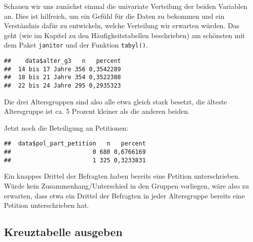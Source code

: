 \documentclass[
]{book}
\newenvironment{Shaded}{\begin{snugshade}}{\end{snugshade}}
\newcommand{\CommentTok}[1]{\textcolor[rgb]{0.56,0.35,0.01}{\textit{#1}}}
\newcommand{\FunctionTok}[1]{\textcolor[rgb]{0.00,0.00,0.00}{#1}}
\newcommand{\NormalTok}[1]{#1}
\newcommand{\SpecialCharTok}[1]{\textcolor[rgb]{0.00,0.00,0.00}{#1}}
\begin{document}
Schauen wir uns zunächst einmal die univariate Verteilung der beiden Variablen an.
Dies ist hilfreich, um ein Gefühl für die Daten zu bekommen und ein Verständnis dafür zu entwickeln, welche Verteilung wir erwarten würden.
Das geht (wie im Kapitel zu den Häufigkeitstabellen beschrieben) am schönsten mit dem Paket \texttt{janitor} und der Funktion \texttt{tabyl()}.

\begin{Shaded}
\end{Shaded}

\begin{verbatim}
##    data$alter_g3   n   percent
##  14 bis 17 Jahre 356 0,3542289
##  18 bis 21 Jahre 354 0,3522388
##  22 bis 24 Jahre 295 0,2935323
\end{verbatim}

Die drei Altersgruppen sind also alle etwa gleich stark besetzt, die älteste Altersgruppe ist ca. 5 Prozent kleiner als die anderen beiden.

Jetzt noch die Beteiligung an Petitionen:

\begin{Shaded}
\end{Shaded}

\begin{verbatim}
##  data$pol_part_petition   n   percent
##                       0 680 0,6766169
##                       1 325 0,3233831
\end{verbatim}

Ein knappes Drittel der Befragten haben bereits eine Petition unterschrieben. Würde kein Zusammenhang/Unterschied in den Gruppen vorliegen, wäre also zu erwarten, dass etwa ein Drittel der Befragten in jeder Altersgruppe bereits eine Petition unterschrieben hat.

\hypertarget{kreuztabelle-ausgeben}{%
\subsection{Kreuztabelle ausgeben}\label{kreuztabelle-ausgeben}}
\end{document}
